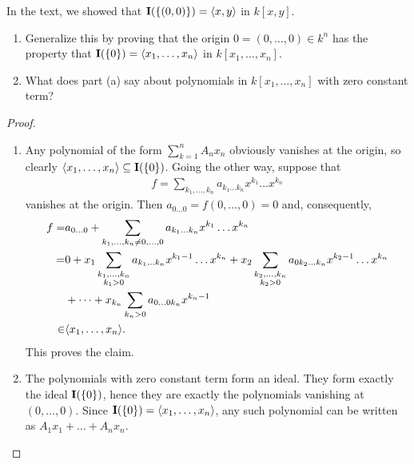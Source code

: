 \begin{exercise}{18}
In the text, we showed that $\mathbf{I}(\{(0,0)\}) = \langle x,y\rangle$ in $k[x,y]$.
\begin{enumerate}
    \item Generalize this by proving that the origin $0 = (0,\dots,0)\in k^n$ has the property that $\mathbf{I}(\{0\}) = \langle x_1,\dots,x_n\rangle$ in $k[x_1,\dots,x_n]$.
    \item What does part (a) say about polynomials in $k[x_1,\dots,x_n]$ with zero constant term?
\end{enumerate}
\end{exercise}
\begin{proof}
    \begin{enumerate}
        \item Any polynomial of the form $\sum_{k=1}^n A_n x_n$ obviously vanishes at the origin, so clearly $\langle x_1,\dots,x_n\rangle \subseteq \mathbf{I}(\{0\})$. 
        Going the other way, suppose that
        \begin{align*}
            f = \sum_{k_1,\dots,k_n} a_{k_1\dots k_n} x^{k_1} \dots x^{k_n}
        \end{align*}
        vanishes at the origin. 
        Then $a_{0\dots 0} = f(0,\dots,0) = 0$ and, consequently,
        \begin{align*}
            f
            =& a_{0\dots 0} + \sum_{k_1,\dots,k_n\neq 0,\dots,0} a_{k_1\dots k_n} x^{k_1}\dots x^{k_n}\\
            =& 0 + x_1 \sum_{\substack{k_1,\dots,k_n\\ k_1>0}} a_{k_1\dots k_n} x^{k_1-1}\dots x^{k_n} + x_2\sum_{\substack{k_2,\dots,k_n\\ k_2 > 0}} a_{0 k_2\dots k_n} x^{k_2 - 1}\dots x^{k_n}\\
            & + \dots + x_{k_n}\sum_{k_n>0} a_{0\dots0k_n} x^{k_n - 1}\\
            \in & \langle x_1,\dots,x_n\rangle.
        \end{align*}
        This proves the claim.
        \item The polynomials with zero constant term form an ideal. 
        They form exactly the ideal $\mathbf{I}(\{0\})$, hence they are exactly the polynomials vanishing at $(0,\dots,0)$. 
        Since $\mathbf{I}(\{0\}) = \langle x_1,\dots,x_n\rangle$, any such polynomial can be written as $A_1 x_1 + \dots + A_n x_n$.
    \end{enumerate}
\end{proof}

